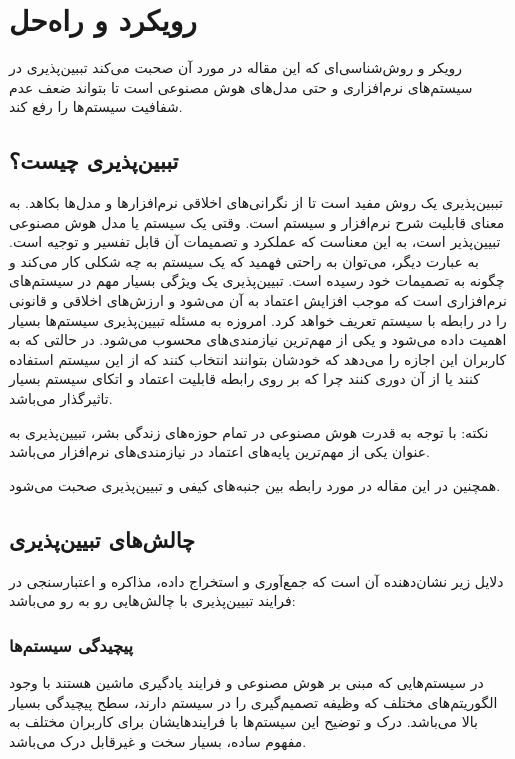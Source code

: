 \section{رویکرد و راه‌حل}

رویکر و روش‌شناسی‌ای که این مقاله در مورد آن صحبت می‌کند تببین‌پذیری در
سیستم‌های نرم‌افزاری و حتی مدل‌های هوش مصنوعی است تا بتواند ضعف عدم شفافیت
سیستم‌ها را رفع کند.

\subsection{تببین‌پذیری چیست؟}

تببین‌پذیری یک روش مفید است تا از نگرانی‌های اخلاقی نرم‌افزار‌ها و مدل‌ها بکاهد.
به معنای قابلیت شرح نرم‌افزار و سیستم است. وقتی یک سیستم یا مدل هوش مصنوعی
تبیین‌پذیر است، به این معناست که عملکرد و تصمیمات آن قابل تفسیر و توجیه است. به
عبارت دیگر، می‌توان به راحتی فهمید که یک سیستم به چه شکلی کار می‌کند و چگونه به
تصمیمات خود رسیده است. تبیین‌پذیری یک ویژگی بسیار مهم در سیستم‌های نرم‌افزاری
است که موجب افزایش اعتماد به آن می‌شود و ارزش‌های اخلاقی و قانونی را در رابطه با
سیستم تعریف خواهد کرد. امروزه به مسئله تبیین‌پذیری سیستم‌ها بسیار اهمیت داده
می‌شود و یکی از مهم‌ترین نیازمندی‌های  محسوب می‌شود. در حالتی
که به کاربران این اجازه را می‌دهد که خودشان بتوانند انتخاب کنند که از این سیستم
استفاده کنند یا از آن دوری کنند چرا که بر روی رابطه قابلیت اعتماد و اتکای سیستم
بسیار تاثیرگذار می‌باشد.

نکته: با توجه به قدرت هوش مصنوعی در تمام حوزه‌های زندگی بشر، تبیین‌پذیری به
عنوان یکی از مهم‌ترین پایه‌های اعتماد در نیازمندی‌های نرم‌افزار می‌باشد.


همچنین در این مقاله در مورد رابطه بین جنبه‌های کیفی و تبیین‌پذیری صحبت می‌شود.

\subsection{چالش‌های تبیین‌پذیری}

دلایل زیر نشان‌دهنده آن است که جمع‌آوری و استخراج داده، مذاکره و اعتبارسنجی در
فرایند تبیین‌پذیری با چالش‌هایی رو به رو می‌باشد:

\subsubsection{پیچیدگی سیستم‌ها}

در سیستم‌هایی که مبنی بر هوش مصنوعی و فرایند یادگیری ماشین هستند با وجود
الگوریتم‌های مختلف که وظیفه تصمیم‌گیری را در سیستم دارند، سطح پیچیدگی بسیار بالا
می‌باشد. درک و توضیح این سیستم‌ها با فرایند‌هایشان برای کاربران مختلف به مفهوم
ساده، بسیار سخت و غیرقابل درک می‌باشد.

